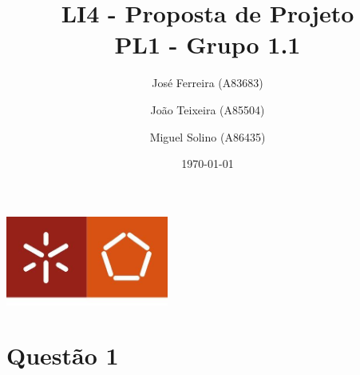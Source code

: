 \documentclass[a4paper]{report}
\begin{document}
\title{LI4 - Proposta de Projeto\\ 
\large PL1 - Grupo 1.1}
\author{José Ferreira (A83683) \and João Teixeira (A85504) \and Miguel Solino (A86435)}
\date{\today}

\begin{center}
    \begin{minipage}{0.75\linewidth}
        \centering
        \includegraphics[width=0.4\textwidth]{images/eng.jpeg}\par\vspace{1cm}
        \vspace{1.5cm}
        \href{https://www.uminho.pt/PT}
        {\color{black}{\scshape\LARGE Universidade do Minho}} \par
        \vspace{1cm}
        \href{https://www.di.uminho.pt/}
        {\color{black}{\scshape\Large Departamento de Informática}} \par
        \vspace{1.5cm}
        \maketitle
    \end{minipage}
\end{center}

\chapter{Questão 1}
\end{document}
